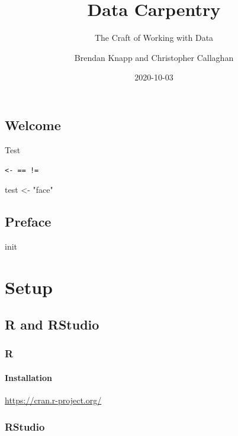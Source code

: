 \documentclass[
]{report}
\title{Data Carpentry}
\subtitle{The Craft of Working with Data}
\author{Brendan Knapp and Christopher Callaghan}
\date{2020-10-03}
\newenvironment{Shaded}{\begin{snugshade}}{\end{snugshade}}
\newcommand{\NormalTok}[1]{#1}
\newcommand{\StringTok}[1]{\textcolor[rgb]{0.31,0.60,0.02}{#1}}
\begin{document}
\maketitle

{
\setcounter{tocdepth}{4}
\tableofcontents
}
\hypertarget{welcome}{%
\chapter*{Welcome}\label{welcome}}

Test

\texttt{\textless{}-\ ==\ !=}

\begin{Shaded}
\begin{Highlighting}[]
\NormalTok{test \textless{}{-}}\StringTok{ "face"}
\end{Highlighting}
\end{Shaded}

\hypertarget{preface}{%
\chapter*{Preface}\label{preface}}

init

\cleardoublepage

\hypertarget{part-setup}{%
\part{Setup}\label{part-setup}}

\hypertarget{setup-r-and-rstudio}{%
\chapter{R and RStudio}\label{setup-r-and-rstudio}}

\hypertarget{r}{%
\section{R}\label{r}}

\hypertarget{installation}{%
\subsection{Installation}\label{installation}}

\url{https://cran.r-project.org/}

\hypertarget{rstudio}{%
\section{RStudio}\label{rstudio}}
\end{document}
